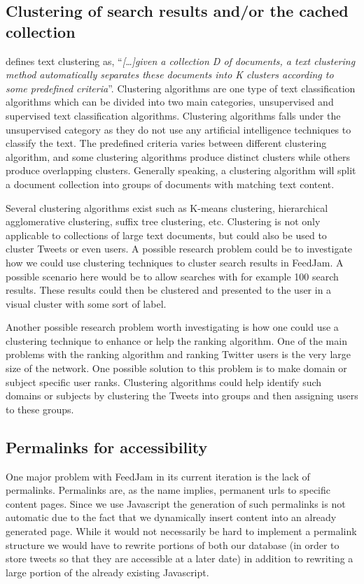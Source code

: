 \subsection{Clustering of search results and/or the cached collection} %
\citet[pg. 286]{Baeza-Yates2011} defines text clustering as, ``\textit{[\dots]given a collection D of documents, a text clustering method automatically separates these documents into K clusters according to some predefined criteria}''. Clustering algorithms are one type of text classification algorithms which can be divided into two main categories, unsupervised and supervised text classification algorithms. Clustering algorithms falls under the unsupervised category as they do not use any artificial intelligence techniques to classify the text. The predefined criteria varies between different clustering algorithm, and some clustering algorithms produce distinct clusters while others produce overlapping clusters. Generally speaking, a clustering algorithm will split a document collection into groups of documents with matching text content.

Several clustering algorithms exist such as K-means clustering, hierarchical agglomerative clustering, suffix tree clustering, etc. \cite{Baeza-Yates2011} Clustering is not only applicable to collections of large text documents, but could also be used to cluster Tweets or even users. A possible research problem could be to investigate how we could use clustering techniques to cluster search results in FeedJam. A possible scenario here would be to allow searches with for example 100 search results. These results could then be clustered and presented to the user in a visual cluster with some sort of label.

Another possible research problem worth investigating is how one could use a clustering technique to enhance or help the ranking algorithm. One of the main problems with the ranking algorithm and ranking Twitter users is the very large size of the network. One possible solution to this problem is to make domain or subject specific user ranks. Clustering algorithms could help identify such domains or subjects by clustering the Tweets into groups and then assigning users to these groups.

\subsection{Permalinks for accessibility}
One major problem with FeedJam in its current iteration is the lack of permalinks. Permalinks are, as the name implies, permanent urls to specific content pages. Since we use Javascript the generation of such permalinks is not automatic due to the fact that we dynamically insert content into an already generated page. While it would not necessarily be hard to implement a permalink structure we would have to rewrite portions of both our database (in order to store tweets so that they are accessible at a later date) in addition to rewriting a large portion of the already existing Javascript.